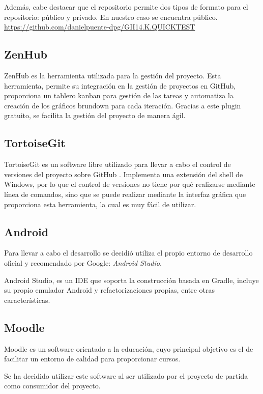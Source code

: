 Además, cabe destacar que el repositorio permite dos tipos de formato para el repositorio: público y privado. En nuestro caso se encuentra público. \url{https://github.com/danielpuente-dpg/GII14.K.QUICKTEST}

\subsection{ZenHub}\label{zenhub}

ZenHub es la herramienta utilizada para la gestión del proyecto.  Esta herramienta, permite su integración en la gestión de proyectos en GitHub, proporciona un tablero kanban para gestión de las tareas y automatiza la creación de los gráficos brundown para cada iteración. Gracias a este plugin gratuito, se facilita la gestión del proyecto de manera ágil. \cite{wiki:zenhub}

\subsection{TortoiseGit}

TortoiseGit es un software libre utilizado para llevar a cabo el control de versiones del proyecto sobre GitHub \cite{wiki:tortoisegit}. Implementa una extensión del shell de Windows, por lo que el control de versiones no tiene por qué realizarse mediante línea de comandos, sino que se puede realizar mediante la interfaz gráfica que proporciona esta herramienta, la cual es muy fácil de utilizar.


\subsection{Android}

Para llevar a cabo el desarrollo se decidió utiliza el propio entorno de desarrollo oficial y recomendado por Google: \emph{Android Studio.}

Android Studio, es un IDE que soporta la construcción basada en Gradle, incluye su propio emulador Android y refactorizaciones propias, entre otras características.

\subsection{Moodle}

Moodle es un software orientado a la educación, cuyo principal objetivo es el de facilitar un entorno de calidad para proporcionar cursos. \cite{wiki:moodle}

Se ha decidido utilizar este software al ser utilizado por el proyecto de partida como consumidor del proyecto.


